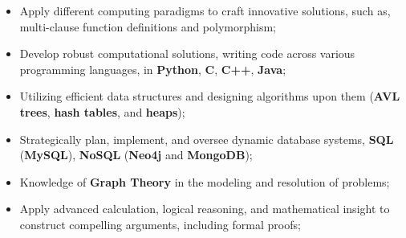 \documentclass[9pt,a4paper]{altacv}
\begin{document}
\begin{fullwidth}
\divider


\begin{itemize}
    \item Apply different computing paradigms to craft innovative solutions, such as, multi-clause function definitions and polymorphism;
    \item Develop robust computational solutions, writing code across various programming languages, in \textbf{Python}, \textbf{C}, \textbf{C++}, \textbf{Java};
    \item Utilizing efficient data structures and designing algorithms upon them (\textbf{AVL trees}, \textbf{hash tables}, and \textbf{heaps});
    \item Strategically plan, implement, and oversee dynamic database systems, \textbf{SQL} (\textbf{MySQL}), \textbf{NoSQL} (\textbf{Neo4j} and \textbf{MongoDB});
    \item Knowledge of \textbf{Graph Theory} in the modeling and resolution of problems;
    \item Apply advanced calculation, logical reasoning, and mathematical insight to construct compelling arguments, including formal proofs;
\end{itemize}

\end{fullwidth}

\medskip




\end{document}
